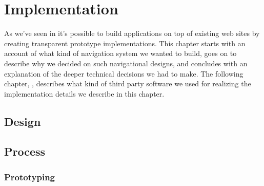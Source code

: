 \chapter{Implementation}
\label{chapter:implementation}


As we've seen in 
it's possible to build applications on top of existing web sites by creating
transparent prototype implementations. This chapter starts with an account of
what kind of navigation system we wanted to build, goes on to describe why we
decided on such navigational designs, and concludes with an explanation of the
deeper technical decisions we had to make. The following chapter,
,
describes what kind of third party software we used for realizing the
implementation details we describe in this chapter.


\section{Design}

%
%
%

\section{Process}

\subsection{Prototyping}

